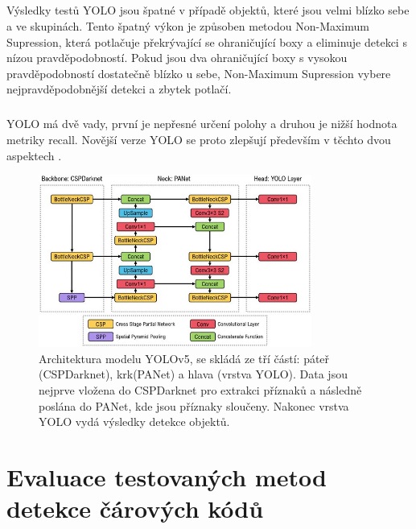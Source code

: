 \paragraph{}
Výsledky testů YOLO jsou špatné v případě objektů, které jsou velmi blízko sebe a ve skupinách. Tento špatný výkon je způsoben metodou Non-Maximum Supression, která potlačuje překrývající se ohraničující boxy a eliminuje detekci s nízou pravděpodobností. Pokud jsou dva ohraničující boxy s vysokou pravděpodobností dostatečně blízko u sebe, Non-Maximum Supression vybere nejpravděpodobnější detekci a zbytek potlačí.
\paragraph{}
YOLO má dvě vady, první je nepřesné určení polohy a druhou je nižší hodnota metriky recall. Novější verze YOLO se proto zlepšují především v těchto dvou aspektech \cite{yolo2}.
\pagebreak
\begin{figure}[h]\centering
    \centering
    \includegraphics[width=0.8\textwidth]{obrazky-figures/yolo_overview.png}
    \caption{Architektura modelu YOLOv5, se skládá ze tří částí: páteř (CSPDarknet), krk(PANet) a hlava (vrstva YOLO). Data jsou nejprve vložena do CSPDarknet pro extrakci příznaků a následně poslána do PANet, kde jsou příznaky sloučeny. Nakonec vrstva YOLO vydá výsledky detekce objektů\protect\footnotemark{}.}
    \label{yolov5_architecture}
\end{figure}

\chapter{Evaluace testovaných metod detekce čárových kódů}
\label{tested_methods}
